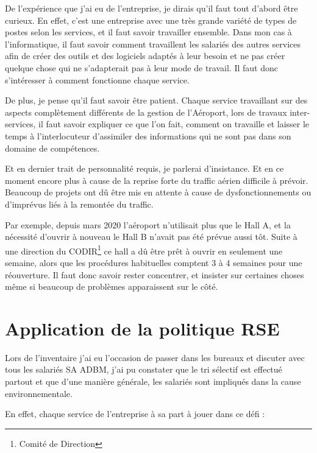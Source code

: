 De l'expérience que j'ai eu de l'entreprise, je dirais qu'il faut tout d'abord être curieux. En effet, c'est une entreprise avec une très grande variété de types de postes selon les services, et il faut savoir travailler ensemble.
Dans mon cas à l'informatique, il faut savoir comment travaillent les salariés des autres services afin de créer des outils et des logiciels adaptés à leur besoin et ne pas créer quelque chose qui ne s'adapterait pas à leur mode de travail.
Il faut donc s'intéresser à comment fonctionne chaque service.\newline

De plus, je pense qu'il faut savoir être patient. Chaque service travaillant sur des aspects complètement différents de la gestion de l'Aéroport, lors de travaux inter-services, il faut savoir expliquer ce que l'on fait, comment on travaille et laisser le temps à l'interlocuteur d'assimiler des informations qui ne sont pas dans son domaine de compétences.\newline

Et en dernier trait de personnalité requis, je parlerai d’insistance. Et en ce moment encore plus à cause de la reprise forte du traffic aérien difficile à prévoir. Beaucoup de projets ont dû être mis en attente à cause de dysfonctionnements ou d’imprévus liés à la remontée du traffic.

Par exemple, depuis mars 2020 l’aéroport n’utilisait plus que le Hall A, et la nécessité d’ouvrir à nouveau le Hall B n’avait pas été prévue aussi tôt. Suite à une direction du CODIR\footnote{Comité de Direction} ce hall a dû être prêt à ouvrir en seulement une semaine, alors que les procédures habituelles comptent 3 à 4 semaines pour une réouverture. Il faut donc savoir rester concentrer, et insister sur certaines choses même si beaucoup de problèmes apparaissent sur le côté.

\section{Application de la politique RSE}

Lors de l'inventaire j'ai eu l'occasion de passer dans les bureaux et discuter avec tous les salariés SA ADBM, j'ai pu constater que le tri sélectif est effectué partout et que d'une manière générale, les salariés sont impliqués dans la cause environnementale.\newline

En effet, chaque service de l'entreprise à sa part à jouer dans ce défi :

